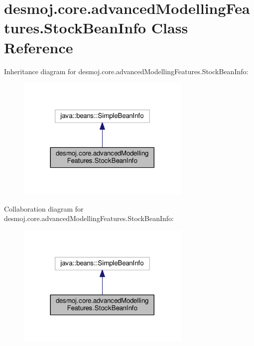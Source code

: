 \section{desmoj.\-core.\-advanced\-Modelling\-Features.\-Stock\-Bean\-Info Class Reference}
\label{classdesmoj_1_1core_1_1advanced_modelling_features_1_1_stock_bean_info}


Inheritance diagram for desmoj.\-core.\-advanced\-Modelling\-Features.\-Stock\-Bean\-Info\-:
\nopagebreak
\begin{figure}[H]
\begin{center}
\leavevmode
\includegraphics[width=236pt]{classdesmoj_1_1core_1_1advanced_modelling_features_1_1_stock_bean_info__inherit__graph}
\end{center}
\end{figure}


Collaboration diagram for desmoj.\-core.\-advanced\-Modelling\-Features.\-Stock\-Bean\-Info\-:
\nopagebreak
\begin{figure}[H]
\begin{center}
\leavevmode
\includegraphics[width=236pt]{classdesmoj_1_1core_1_1advanced_modelling_features_1_1_stock_bean_info__coll__graph}
\end{center}
\end{figure}
